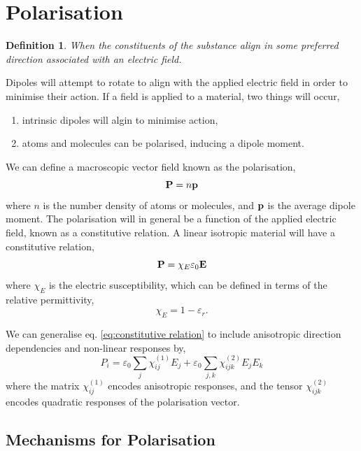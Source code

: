 \documentclass{book}
\newenvironment{aside}
{\begin{mdframed}[style=0,%
		leftline=false,rightline=false,leftmargin=2em,rightmargin=2em,%
		innerleftmargin=0pt,innerrightmargin=0pt,linewidth=0.75pt,%
		skipabove=7pt,skipbelow=7pt]\small}
	{\end{mdframed}}
\newtheorem*{definition}{Definition}
\begin{document}
\section{Polarisation}
\begin{definition}
	When the constituents of the substance align in some preferred direction associated with an electric field.
\end{definition}
Dipoles will attempt to rotate to align with the applied electric field in order to minimise their action. If a field is applied to a material, two things will occur,
\begin{enumerate}
	\item intrinsic dipoles will algin to minimise action,
	\item atoms and molecules can be polarised, inducing a dipole moment.
\end{enumerate}
We can define a macroscopic vector field known as the polarisation,
\begin{equation}
	\vb{P} = n\vb{p}
\end{equation}
where $n$ is the number density of atoms or molecules, and $\vb{p}$ is the average dipole moment. The polarisation will in general be a function of the applied electric field, known as a constitutive relation. A linear isotropic material will have a constitutive relation,
\begin{equation}
	\vb{P} = \chi_E\varepsilon_0\vb{E} \label{eq:constitutive relation}
\end{equation}
where $\chi_E$ is the electric susceptibility, which can be defined in terms of the relative permittivity,
\begin{equation}
	\chi_E = 1 - \varepsilon_r.
\end{equation}
\begin{aside}
	We can generalise eq. \eqref{eq:constitutive relation} to include anisotropic direction dependencies and non-linear responses by,
	\begin{equation}
		P_i = \varepsilon_0 \sum_j \chi_{ij}^{(1)}E_j + \varepsilon_0 \sum_{j,k} \chi_{ijk}^{(2)}E_jE_k
	\end{equation}
	where the matrix $\chi_{ij}^{(1)}$ encodes anisotropic responses, and the tensor $\chi_{ijk}^{(2)}$ encodes quadratic responses of the polarisation vector.
\end{aside}
\subsection{Mechanisms for Polarisation}
\end{document}
